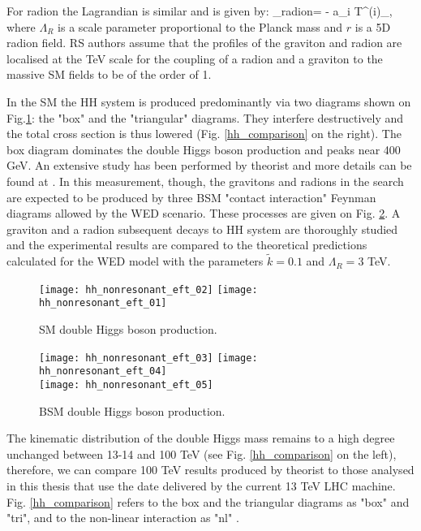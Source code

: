 For radion the Lagrandian is similar and is given by:
\beqn\label{lagr_radion}
\Lagr_{radion}=  -  \times a_i T^{\mu (i)}_{\mu},  
\eeqn
where $\Lambda_R$ is a scale parameter proportional to the Planck mass and $r$ is a 5D radion field. RS authors assume that the profiles of the graviton and radion are localised at the TeV scale for the coupling of a radion and a graviton to the massive SM fields to be of the order of 1. 




In the SM the HH system is produced predominantly via two diagrams shown on Fig.\ref{SM_HH}: the "box" and the "triangular" diagrams. They interfere destructively and the total cross section is thus lowered (Fig. \ref{hh_comparison} on the right). The box diagram dominates the double Higgs boson production and peaks near 400 GeV. An extensive study has been performed by theorist and more details can be found at \cite{Chen:2014xra}. In this measurement, though, the gravitons and radions in the search are expected to be produced by three BSM "contact interaction" Feynman diagrams allowed by the WED scenario. These processes are given on Fig. \ref{BSM_HH}.  A graviton and a radion subsequent decays to HH system are thoroughly studied and the experimental results are compared to the theoretical predictions calculated for the WED model with the parameters $\tilde{k}=0.1$ and $\Lambda_R = 3 $ TeV.  




\begin{figure}[H]
  \centering
    \texttt{[image: hh\_nonresonant\_eft\_02]}
     \texttt{[image: hh\_nonresonant\_eft\_01]}
    \caption{SM double Higgs boson production.}
    \label{SM_HH}
\end{figure}


\begin{figure}[H]
  \centering
    \texttt{[image: hh\_nonresonant\_eft\_03]}
    \texttt{[image: hh\_nonresonant\_eft\_04]}\\
     \texttt{[image: hh\_nonresonant\_eft\_05]}
    \caption{BSM double Higgs boson production.}
    \label{BSM_HH}
\end{figure}



The kinematic distribution of the double Higgs mass remains to a high degree unchanged between 13-14 and 100 TeV (see Fig. \ref{hh_comparison} on the left), therefore, we can compare 100 TeV results produced by theorist to those analysed in this thesis that use the date delivered by the current 13 TeV LHC machine. Fig. \ref{hh_comparison} refers to the box and the triangular diagrams as "box" and "tri", and to the non-linear interaction as "nl"  \cite{Contino:2012xk}. 



